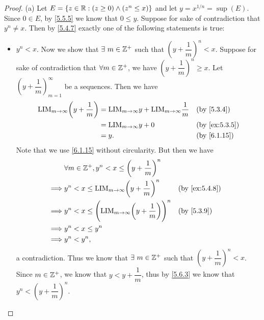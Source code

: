 \begin{proof}{(a)}
  Let \(E = \{z \in \mathbb{R} : (z \geq 0) \land (z^n \leq x)\}\) and let \(y = x^{1 / n} = \sup(E)\).
  Since \(0 \in E\), by \cref{5.5.5} we know that \(0 \leq y\).
  Suppose for sake of contradiction that \(y^n \neq x\).
  Then by \cref{5.4.7} exactly one of the following statements is true:
  \begin{itemize}
    \item \(y^n < x\).
          Now we show that \(\exists\ m \in \mathbb{Z}^+\) such that \((y + \dfrac{1}{m})^n < x\).
          Suppose for sake of contradiction that \(\forall m \in \mathbb{Z}^+\), we have \((y + \dfrac{1}{m})^n \geq x\).
          Let \((y + \dfrac{1}{m})_{m = 1}^\infty\) be a sequences.
          Then we have
          \begin{align*}
            \text{LIM}_{m \to \infty} \bigg(y + \dfrac{1}{m}\bigg) & = \text{LIM}_{m \to \infty} y + \text{LIM}_{m \to \infty} \dfrac{1}{m} &  & \text{(by \cref{5.3.4})}    \\
                                                                   & = \text{LIM}_{m \to \infty} y + 0                                      &  & \text{(by \cref{ex:5.3.5})} \\
                                                                   & = y.                                                                   &  & \text{(by \cref{6.1.15})}
          \end{align*}
          Note that we use \cref{6.1.15} without circularity.
          But then we have
          \begin{align*}
                     & \forall m \in \Z^+, y^n < x \leq \bigg(y + \dfrac{1}{m}\bigg)^n                                                    \\
            \implies & y^n < x \leq \text{LIM}_{m \to \infty} \bigg(y + \dfrac{1}{m}\bigg)^n             &  & \text{(by \cref{ex:5.4.8})} \\
            \implies & y^n < x \leq \Bigg(\text{LIM}_{m \to \infty} \bigg(y + \dfrac{1}{m}\bigg)\Bigg)^n &  & \text{(by \cref{5.3.9})}    \\
            \implies & y^n < x \leq y^n                                                                                                   \\
            \implies & y^n < y^n,
          \end{align*}
          a contradiction.
          Thus we know that \(\exists\ m \in \mathbb{Z}^+\) such that \((y + \dfrac{1}{m})^n < x\).
          Since \(m \in \mathbb{Z}^+\), we know that \(y < y + \dfrac{1}{m}\), thus by \cref{5.6.3} we know that \(y^n < (y + \dfrac{1}{m})^n\).

\end{itemize}
\end{proof}
